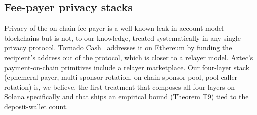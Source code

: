 \subsection{Fee-payer privacy stacks}

Privacy of the on-chain fee payer is a well-known leak in account-model blockchains but is not, to our knowledge, treated systematically in any single privacy protocol. Tornado Cash~\cite{tornadocash} addresses it on Ethereum by funding the recipient's address out of the protocol, which is closer to a relayer model. Aztec's payment-on-chain primitives include a relayer marketplace. Our four-layer stack (ephemeral payer, multi-sponsor rotation, on-chain sponsor pool, pool caller rotation) is, we believe, the first treatment that composes all four layers on Solana specifically and that ships an empirical bound (Theorem T9) tied to the deposit-wallet count.
